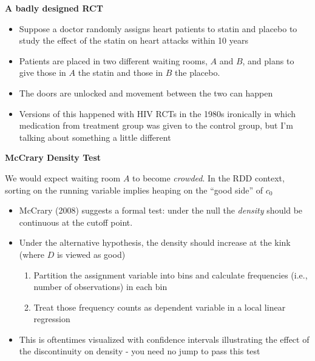 \documentclass[notes=show]{beamer}
\begin{document}
\begin{frame}[plain]
\begin{center}
\textbf{A badly designed RCT}
\end{center}

	\begin{itemize}
		\item Suppose a doctor randomly assigns heart patients to statin and placebo to study the effect of the statin on heart attacks within 10 years 
		\item Patients are placed in two different waiting rooms, $A$ and $B$, and plans to give those in $A$ the statin and those in $B$ the placebo. 
		\item The doors are unlocked and movement between the two can happen
		\item Versions of this happened with HIV RCTs in the 1980s ironically in which medication from treatment group was given to the control group, but I'm talking about something a little different
	\end{itemize}

\end{frame}

\begin{frame}[plain]
	\begin{center}
	\textbf{McCrary Density Test}
	\end{center}

We would expect waiting room $A$ to become \emph{crowded}. In the RDD context, sorting on the running variable implies heaping on the ``good side'' of $c_0$
	\begin{itemize}
	\item McCrary (2008) suggests a formal test: under the null the \emph{density} should be continuous at the cutoff point. 
	\item Under the alternative hypothesis, the density should increase at the kink (where $D$ is viewed as good) 
		\begin{enumerate}
		\item Partition the assignment variable into bins and calculate frequencies (i.e., number of observations) in each bin
		\item Treat those frequency counts as dependent variable in a local linear regression
		\end{enumerate}
	\item This is oftentimes visualized with confidence intervals illustrating the effect of the discontinuity on density - you need no jump to pass this test
	\end{itemize}
	
\end{frame}
\end{document}
